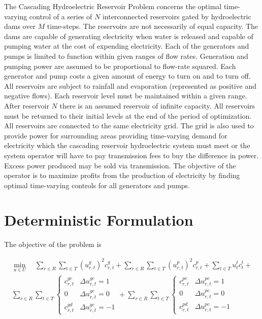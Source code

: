 \documentclass[12pt]{article}
\begin{document}
The Cascading Hydroelectric Reservoir Problem concerns the optimal time-varying control of a series of $N$ interconnected reservoirs gated by hydroelectric dams over $M$ time-steps. The reservoirs are not necessarily of equal capacity. The dams are capable of generating electricity when water is released and capable of pumping water at the cost of expending electricity. Each of the generators and pumps is limited to function within given ranges of flow rates. Generation and pumping power are assumed to be proportional to flow-rate squared. Each generator and pump costs a given amount of energy to turn on and to turn off. All reservoirs are subject to rainfall and evaporation (represented as positive and negative flows). Each reservoir level must be maintained within a given range. After reservoir $N$ there is an assumed reservoir of infinite capacity. All reservoirs must be returned to their initial levels at the end of the period of optimization. All reservoirs are connected to the same electricity grid. The grid is also used to provide power for surrounding areas providing time-varying demand for electricity which the cascading reservoir hydroelectric system must meet or the system operator will have to pay transmission fees to buy the difference in power. Excess power produced may be sold via transmission. The objective of the operator is to maximize profits from the production of electricity by finding optimal time-varying controls for all generators and pumps.

\section*{Deterministic Formulation}

The objective of the problem is

\begin{gather}
	\min_{u\in U}\quad
	\sum_{r\in R}\sum_{t\in T}(u_{r,t}^{g})^2c_{r,t}^{g}+
	\sum_{r\in R}\sum_{t\in T}(u_{r,t}^{p})^2c_{r,t}^{p}+
	\sum_{t\in T}u_{t}^{t}c_{t}^{t}+\\
	\sum_{r\in R}\sum_{t\in T}\begin{cases}
		c_{r,t}^{gc} & \Delta u_{r,t}^{gc}=1\\
		0 & \Delta u_{r,t}^{gc}=0\\
		c_{r,t}^{gd} & \Delta u_{r,t}^{gc}=-1
	\end{cases}+
	\sum_{r\in R}\sum_{t\in T}\begin{cases}
		c_{r,t}^{pc} & \Delta u_{r,t}^{pc}=1\\
		0 & \Delta u_{r,t}^{pc}=0\\
		c_{r,t}^{pd} & \Delta u_{r,t}^{pc}=-1
	\end{cases}\label{eq:obj}
\end{gather}
\end{document}
